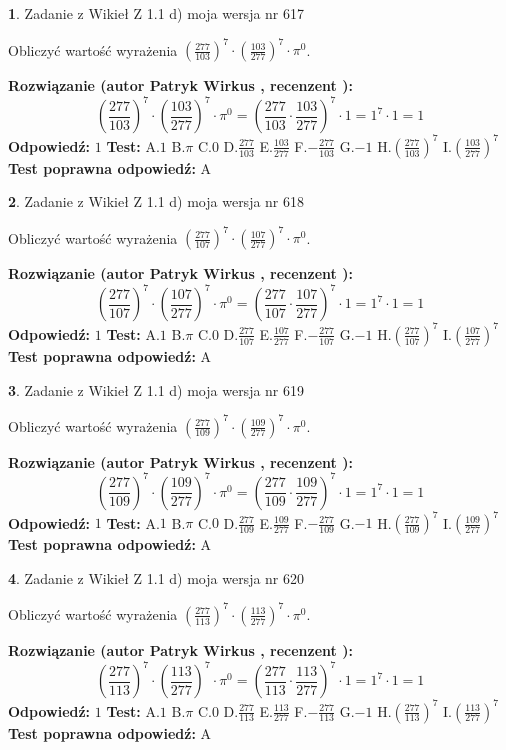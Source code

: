 \documentclass[12pt, a4paper]{article}
\theoremstyle{definition} %
\newtheorem{zad}{}
\newcommand{\zadStart}[1]{\begin{zad}#1\newline}
\newcommand{\zadStop}{\end{zad}}
\newcommand{\rozwStart}[2]{\noindent \textbf{Rozwiązanie (autor #1 , recenzent #2): }\newline}
\newcommand{\rozwStop}{\newline}
\newcommand{\odpStart}{\noindent \textbf{Odpowiedź:}\newline}
\newcommand{\odpStop}{\newline}
\newcommand{\testStart}{\noindent \textbf{Test:}\newline}
\newcommand{\testStop}{\newline}
\newcommand{\kluczStart}{\noindent \textbf{Test poprawna odpowiedź:}\newline}
\newcommand{\kluczStop}{\newline}
\begin{document}
\zadStart{Zadanie z Wikieł Z 1.1 d) moja wersja nr 617}

Obliczyć wartość wyrażenia $(\frac{277}{103})^{7} \cdot (\frac{103}{277})^{7} \cdot \pi^{0}$.
\zadStop
\rozwStart{Patryk Wirkus}{}
$$(\frac{277}{103})^{7} \cdot (\frac{103}{277})^{7} \cdot \pi^{0} = (\frac{277}{103} \cdot \frac{103}{277})^{7} \cdot 1 = 1^{7} \cdot 1 = 1$$
\rozwStop
\odpStart
$1$
\odpStop
\testStart
A.$1$ B.$\pi$ C.$0$ D.$\frac{277}{103}$ E.$\frac{103}{277}$
F.$-\frac{277}{103}$ G.$-1$
H.$(\frac{277}{103})^{7}$
I.$(\frac{103}{277})^{7}$
\testStop
\kluczStart
A
\kluczStop



\zadStart{Zadanie z Wikieł Z 1.1 d) moja wersja nr 618}

Obliczyć wartość wyrażenia $(\frac{277}{107})^{7} \cdot (\frac{107}{277})^{7} \cdot \pi^{0}$.
\zadStop
\rozwStart{Patryk Wirkus}{}
$$(\frac{277}{107})^{7} \cdot (\frac{107}{277})^{7} \cdot \pi^{0} = (\frac{277}{107} \cdot \frac{107}{277})^{7} \cdot 1 = 1^{7} \cdot 1 = 1$$
\rozwStop
\odpStart
$1$
\odpStop
\testStart
A.$1$ B.$\pi$ C.$0$ D.$\frac{277}{107}$ E.$\frac{107}{277}$
F.$-\frac{277}{107}$ G.$-1$
H.$(\frac{277}{107})^{7}$
I.$(\frac{107}{277})^{7}$
\testStop
\kluczStart
A
\kluczStop



\zadStart{Zadanie z Wikieł Z 1.1 d) moja wersja nr 619}

Obliczyć wartość wyrażenia $(\frac{277}{109})^{7} \cdot (\frac{109}{277})^{7} \cdot \pi^{0}$.
\zadStop
\rozwStart{Patryk Wirkus}{}
$$(\frac{277}{109})^{7} \cdot (\frac{109}{277})^{7} \cdot \pi^{0} = (\frac{277}{109} \cdot \frac{109}{277})^{7} \cdot 1 = 1^{7} \cdot 1 = 1$$
\rozwStop
\odpStart
$1$
\odpStop
\testStart
A.$1$ B.$\pi$ C.$0$ D.$\frac{277}{109}$ E.$\frac{109}{277}$
F.$-\frac{277}{109}$ G.$-1$
H.$(\frac{277}{109})^{7}$
I.$(\frac{109}{277})^{7}$
\testStop
\kluczStart
A
\kluczStop



\zadStart{Zadanie z Wikieł Z 1.1 d) moja wersja nr 620}

Obliczyć wartość wyrażenia $(\frac{277}{113})^{7} \cdot (\frac{113}{277})^{7} \cdot \pi^{0}$.
\zadStop
\rozwStart{Patryk Wirkus}{}
$$(\frac{277}{113})^{7} \cdot (\frac{113}{277})^{7} \cdot \pi^{0} = (\frac{277}{113} \cdot \frac{113}{277})^{7} \cdot 1 = 1^{7} \cdot 1 = 1$$
\rozwStop
\odpStart
$1$
\odpStop
\testStart
A.$1$ B.$\pi$ C.$0$ D.$\frac{277}{113}$ E.$\frac{113}{277}$
F.$-\frac{277}{113}$ G.$-1$
H.$(\frac{277}{113})^{7}$
I.$(\frac{113}{277})^{7}$
\testStop
\kluczStart
A
\kluczStop
\end{document}

